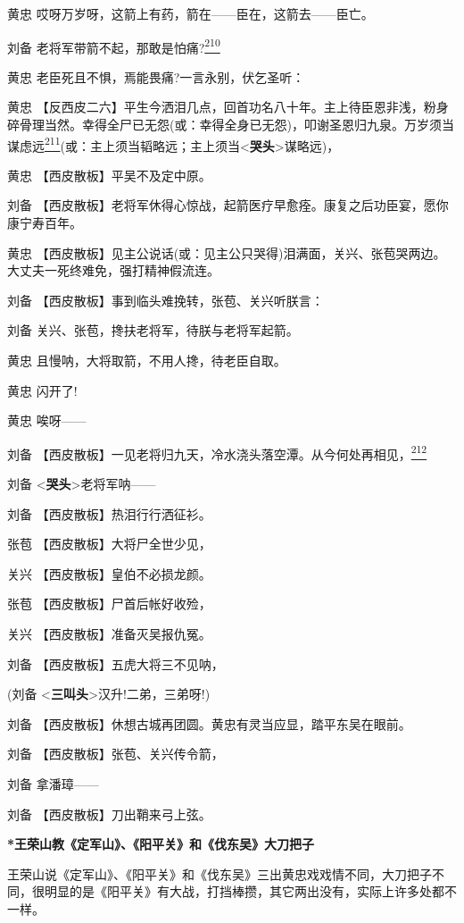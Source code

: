 黄忠 哎呀万岁呀，这箭上有药，箭在------臣在，这箭去------臣亡。

刘备
老将军带箭不起，那敢是怕痛?\protect\hyperlink{fn210}{\textsuperscript{210}}

黄忠 老臣死且不惧，焉能畏痛?一言永别，伏乞圣听：

黄忠
【反西皮二六】平生今洒泪几点，回首功名八十年。主上待臣恩非浅，粉身碎骨理当然。幸得全尸已无怨(或：幸得全身已无怨)，叩谢圣恩归九泉。万岁须当谋虑远\protect\hyperlink{fn211}{\textsuperscript{211}}(或：主上须当韬略远；主上须当\textless{}\textbf{哭头}\textgreater{}谋略远)，

黄忠 【西皮散板】平吴不及定中原。

刘备
【西皮散板】老将军休得心惊战，起箭医疗早愈痊。康复之后功臣宴，愿你康宁寿百年。

黄忠
【西皮散板】见主公说话(或：见主公只哭得)泪满面，关兴、张苞哭两边。大丈夫一死终难免，强打精神假流连。

刘备 【西皮散板】事到临头难挽转，张苞、关兴听朕言：

刘备 关兴、张苞，搀扶老将军，待朕与老将军起箭。

黄忠 且慢呐，大将取箭，不用人搀，待老臣自取。

黄忠 闪开了!

黄忠 唉呀------

刘备
【西皮散板】一见老将归九天，冷水浇头落空潭。从今何处再相见，\protect\hyperlink{fn212}{\textsuperscript{212}}

刘备 \textless{}\textbf{哭头}\textgreater{}老将军呐------

刘备 【西皮散板】热泪行行洒征衫。

张苞 【西皮散板】大将尸全世少见，

关兴 【西皮散板】皇伯不必损龙颜。

张苞 【西皮散板】尸首后帐好收殓，

关兴 【西皮散板】准备灭吴报仇冤。

刘备 【西皮散板】五虎大将三不见呐，

(刘备 \textless{}\textbf{三叫头}\textgreater{}汉升!二弟，三弟呀!)

刘备 【西皮散板】休想古城再团圆。黄忠有灵当应显，踏平东吴在眼前。

刘备 【西皮散板】张苞、关兴传令箭，

刘备 拿潘璋------

刘备 【西皮散板】刀出鞘来弓上弦。

\textbf{*王荣山教《定军山》、《阳平关》和《伐东吴》大刀把子}

王荣山说《定军山》、《阳平关》和《伐东吴》三出黄忠戏戏情不同，大刀把子不同，很明显的是《阳平关》有大战，打挡棒攒，其它两出没有，实际上许多处都不一样。

